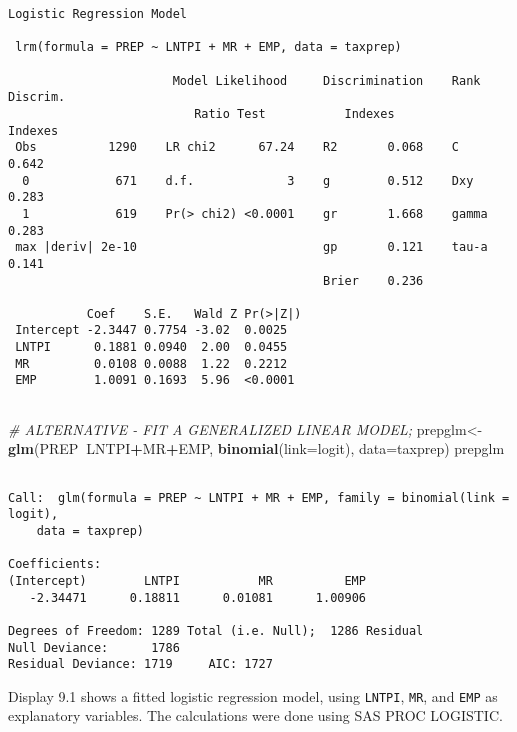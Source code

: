 \documentclass[]{book}
\newenvironment{Shaded}{\begin{snugshade}}{\end{snugshade}}
\newcommand{\CommentTok}[1]{\textcolor[rgb]{0.56,0.35,0.01}{\textit{#1}}}
\newcommand{\DataTypeTok}[1]{\textcolor[rgb]{0.13,0.29,0.53}{#1}}
\newcommand{\KeywordTok}[1]{\textcolor[rgb]{0.13,0.29,0.53}{\textbf{#1}}}
\newcommand{\NormalTok}[1]{#1}
\newcommand{\OperatorTok}[1]{\textcolor[rgb]{0.81,0.36,0.00}{\textbf{#1}}}
\begin{document}
\begin{verbatim}
Logistic Regression Model
 
 lrm(formula = PREP ~ LNTPI + MR + EMP, data = taxprep)
 
                       Model Likelihood     Discrimination    Rank Discrim.    
                          Ratio Test           Indexes           Indexes       
 Obs          1290    LR chi2      67.24    R2       0.068    C       0.642    
  0            671    d.f.             3    g        0.512    Dxy     0.283    
  1            619    Pr(> chi2) <0.0001    gr       1.668    gamma   0.283    
 max |deriv| 2e-10                          gp       0.121    tau-a   0.141    
                                            Brier    0.236                     
 
           Coef    S.E.   Wald Z Pr(>|Z|)
 Intercept -2.3447 0.7754 -3.02  0.0025  
 LNTPI      0.1881 0.0940  2.00  0.0455  
 MR         0.0108 0.0088  1.22  0.2212  
 EMP        1.0091 0.1693  5.96  <0.0001 
 
\end{verbatim}

\begin{Shaded}
\begin{Highlighting}[]
\CommentTok{# ALTERNATIVE - FIT A GENERALIZED LINEAR MODEL;}
\NormalTok{prepglm<-}\KeywordTok{glm}\NormalTok{(PREP}\OperatorTok{~}\NormalTok{LNTPI}\OperatorTok{+}\NormalTok{MR}\OperatorTok{+}\NormalTok{EMP, }\KeywordTok{binomial}\NormalTok{(}\DataTypeTok{link=}\NormalTok{logit), }\DataTypeTok{data=}\NormalTok{taxprep)}
\NormalTok{prepglm}
\end{Highlighting}
\end{Shaded}

\begin{verbatim}

Call:  glm(formula = PREP ~ LNTPI + MR + EMP, family = binomial(link = logit), 
    data = taxprep)

Coefficients:
(Intercept)        LNTPI           MR          EMP  
   -2.34471      0.18811      0.01081      1.00906  

Degrees of Freedom: 1289 Total (i.e. Null);  1286 Residual
Null Deviance:      1786 
Residual Deviance: 1719     AIC: 1727
\end{verbatim}

Display 9.1 shows a fitted logistic regression model, using \texttt{LNTPI}, \texttt{MR}, and \texttt{EMP} as explanatory variables. The calculations were done using SAS PROC LOGISTIC.
\end{document}
